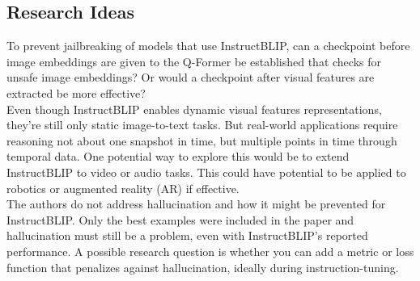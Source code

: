 \documentclass[12pt, letterpaper]{article}
\begin{document}
\begin{spacing}{1.10}
\section{Research Ideas}
\label{sec:further}
\leavevmode\par\noindent
To prevent jailbreaking of models that use InstructBLIP, can a checkpoint before image embeddings are given to the Q-Former be established that checks for unsafe image embeddings? Or would a checkpoint after visual features are extracted be more effective?\\

Even though InstructBLIP enables dynamic visual features representations, they're still only static image-to-text tasks. But real-world applications require reasoning not about one snapshot in time, but multiple points in time through temporal data. One potential way to explore this would be to extend InstructBLIP to video or audio tasks. This could have potential to be applied to robotics or augmented reality (AR) if effective.\\

The authors do not address hallucination and how it might be prevented for InstructBLIP. Only the best examples were included in the paper and hallucination must still be a problem, even with InstructBLIP's reported performance. A possible research question is whether you can add a metric or loss function that penalizes against hallucination, ideally during instruction-tuning.



\end{spacing}
\end{document}
